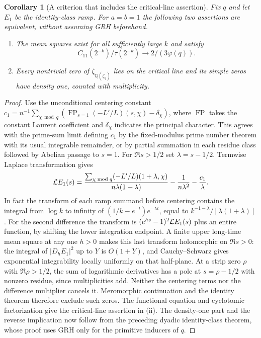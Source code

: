\documentclass[11pt]{article}
\newtheorem{corollary}[theorem]{Corollary}
\begin{document}
\begin{corollary}[A criterion that includes the critical-line assertion]
Fix $q$ and let $E_1$ be the identity-class ramp. For $a=b=1$ the following two assertions are equivalent, without assuming GRH beforehand.
\begin{enumerate}[label=\textup{(\roman*)}]
\item The mean squares exist for all sufficiently large $k$ and satisfy \[ C_{11}(2^{-k})/\tau(2^{-k})\longrightarrow 2/(3\varphi(q)). \]
\item Every nontrivial zero of $\zeta_{\mathbb Q(\zeta_q)}$ lies on the critical line and its simple zeros have density one, counted with multiplicity.
\end{enumerate}
\end{corollary}
\begin{proof}
Use the unconditional centering constant
$c_1=n^{-1}\sum_{\chi\bmod q}(\operatorname{FP}_{s=1}(-L'/L)(s,\chi)-\delta_\chi)$,
where $\operatorname{FP}$ takes the constant Laurent coefficient and
$\delta_\chi$ indicates the principal character. This agrees with the prime-sum limit defining $c_1$ by the fixed-modulus prime number theorem with its usual integrable remainder, or by partial summation in each residue class followed by Abelian passage to $s=1$.
For $\Re s>1/2$ set $\lambda=s-1/2$. Termwise Laplace transformation gives
\[
 {\cal L}E_1(s)=
 \frac{\sum_{\chi\bmod q}(-L'/L)(1+\lambda,\chi)}
 {n\lambda(1+\lambda)}-\frac{1}{n\lambda^2}-\frac{c_1}{\lambda}.
\]
In fact the transform of each ramp summand before centering contains the integral from $\log k$ to infinity of $(1/k-e^{-t})e^{-\lambda t}$, equal to $k^{-1-\lambda}/[\lambda(1+\lambda)]$.
For the second difference the transform is $(e^{hs}-1)^2{\cal L}E_1(s)$ plus an entire function, by shifting the lower integration endpoint.
A finite upper long-time mean square at any one $h>0$ makes this last transform holomorphic on $\Re s>0$: the integral of $|D_h E_1|^2$ up to $Y$ is $O(1+Y)$, and Cauchy--Schwarz gives exponential integrability locally uniformly on that half-plane.
At a strip zero $\rho$ with $\Re\rho>1/2$, the sum of logarithmic derivatives has a pole at $s=\rho-1/2$ with nonzero residue, since multiplicities add. Neither the centering terms nor the difference multiplier cancels it. Meromorphic continuation and the identity theorem therefore exclude such zeros. The functional equation and cyclotomic factorization give the critical-line assertion in (ii). The density-one part and the reverse implication now follow from the preceding dyadic identity-class theorem, whose proof uses GRH only for the primitive inducers of $q$.
\end{proof}
\end{document}
